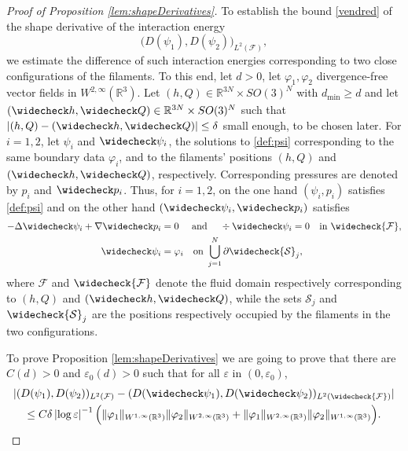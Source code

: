 \documentclass[10pt]{amsart}
\newcommand{\R}{\mathbb{R}}
\let\eps\varepsilon
\newcommand{\dmin}{d_{\min}}
\theoremstyle{definition}
\theoremstyle{remark}
\begin{document}
\begin{proof}[Proof of Proposition \ref{lem:shapeDerivatives}]
To establish the bound \eqref{vendred} of the shape derivative of the interaction energy
\[
\big(D (\psi_1),D (\psi_2)\big)_{L^2(\mathcal F)},\] we estimate the difference of such interaction energies
corresponding to two close configurations of the filaments.
To this end, let $d>0$, let $\varphi_1,\varphi_2 $ divergence-free vector fields in $W^{2,\infty}(\R^3)$. Let $(h,Q) \in \R^{3N} \times SO(3)^N$ with $\dmin \geq d$
and let $(\widecheck h,\widecheck Q) \in \R^{3N} \times SO(3)^N$ such that $|(h, Q) - (\widecheck h,\widecheck Q)| \leq \delta$ small enough, to be chosen later.
For $i = 1,2$, let $\psi_i$ and $ \widecheck \psi_i$, the solutions to \eqref{def:psi} corresponding to the same boundary data $\varphi_i$, and to the filaments' positions $(h, Q)$ and $(\widecheck h,\widecheck Q)$, respectively. Corresponding pressures are denoted by $p_i$ and $\widecheck p_i$.
Thus, for $i = 1,2$, on the one hand $(\psi_i,p_i)$ satisfies \eqref{def:psi}
and on the other hand $(\widecheck \psi_i,\widecheck p_i)$ satisfies
\begin{equation} \label{def:psi-bar}
\begin{aligned}
- \Delta \widecheck \psi_i + \nabla \widecheck p_i &= 0 \quad \text{ and } \quad \div \widecheck \psi_i = 0 \quad \text{in } \widecheck {\mathcal F}, \\
\widecheck \psi_i &= \varphi_i \quad \text{on } \bigcup_{j=1}^N \partial \widecheck {\mathcal S}_j,
\end{aligned}
\end{equation}
where $\mathcal F$ and $\widecheck {\mathcal F}$ denote the fluid domain respectively corresponding to $(h, Q)$ and $(\widecheck h, \widecheck Q)$, while the sets ${\mathcal S}_j$ and $\widecheck {\mathcal S}_j$ are the positions respectively occupied by the filaments in the two configurations.

To prove Proposition \ref{lem:shapeDerivatives}
we are going to prove that there are $C(d)>0$ and $\eps_0(d) >0$ such that for all $\eps$ in $(0, \eps_0)$,
\begin{multline} \label{est:psi_1.psi_2}
|(D(\psi_1),D(\psi_2))_{L^2(\mathcal F)} - (D(\widecheck \psi_1),D(\widecheck \psi_2))_{L^2(\widecheck{\mathcal F})}|
\\ \leq C\delta \left|\log \eps\right|^{-1}
\Bigl(\|\varphi_1\|_{W^{1,\infty} (\R^3) } \|\varphi_2\|_{W^{2,\infty} (\R^3)}
+
\|\varphi_1\|_{W^{2,\infty} (\R^3) } \|\varphi_2\|_{W^{1,\infty} (\R^3)}
\Bigr).
\end{multline}


\end{proof}
\end{document}
